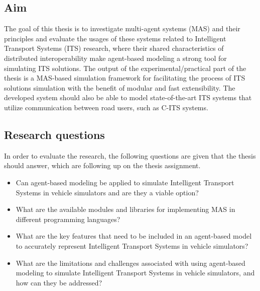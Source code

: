 \documentclass[titlepage, 12pt]{article}
\begin{document}
\subsection{Aim}

The goal of this thesis is to investigate multi-agent systems (MAS) and their principles and
evaluate the usages of these systems related to Intelligent Transport Systems (ITS) research,
where their shared characteristics of distributed interoperability make agent-based modeling a
strong tool for simulating ITS solutions. The output of the experimental/practical part of the
thesis is a MAS-based simulation framework for facilitating the process of ITS solutions
simulation with the benefit of modular and fast extensibility.  The developed system should
also be able to model state-of-the-art ITS systems that utilize communication between road
users, such as C-ITS systems. 

 \subsection{Research questions}

In order to evaluate the research, the following questions are given that the thesis should answer, which are following up on the thesis assignment. 


\begin{itemize}
    \item Can agent-based modeling be applied to simulate Intelligent Transport Systems in vehicle simulators and are they a viable option?
    \item What are the available modules and libraries for implementing MAS in different programming languages?
    \item What are the key features that need to be included in an agent-based model to accurately represent Intelligent Transport Systems in vehicle simulators?
    \item What are the limitations and challenges associated with using agent-based modeling to simulate Intelligent Transport Systems in vehicle simulators, and how can they be addressed?
\end{itemize}
\end{document}
